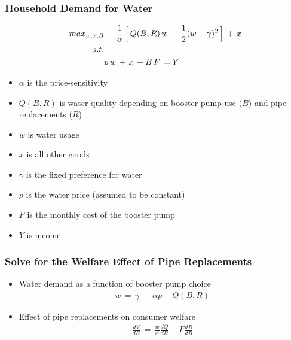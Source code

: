 \documentclass[aspectratio=32]{beamer}
\begin{document}
\begin{frame}
\frametitle{Household Demand for Water}

\begin{align*}
\label{eq:utility}
max_{w,x,B} &\hspace{.5cm}\frac{1}{\alpha} \, \Big[ \,  Q(B,R) \,  w  \, -\, \frac{1}{2}(w - \gamma)^2 \, \Big] \, + \, x  \\
s.t.& \\
&p\,w \,+\, x \, +  B \, F \, = Y
\end{align*}

\begin{itemize}
  \item $\alpha$ is the price-sensitivity
  \item $Q(B,R)$ is water quality depending on booster pump use ($B$) and pipe replacements ($R$)
  \item $w$ is water usage
  \item $x$ is all other goods
  \item $\gamma$ is the fixed preference for water
  \item $p$ is the water price (assumed to be constant)
  \item $F$ is the monthly cost of the booster pump
  \item $Y$ is income
\end{itemize}

\end{frame}


\begin{frame}
\frametitle{Solve for the Welfare Effect of Pipe Replacements }

\begin{itemize}
  \item Water demand as a function of booster pump choice
      \begin{align*}
      w \, = \, \gamma \, - \, \alpha p +  Q(B,R)
      \end{align*}
  \item Effect of pipe replacements on consumer welfare
      \begin{align*}
      \frac{dV}{dR}\,=\,\frac{w}{\alpha} \frac{dQ}{dR} - F \frac{dB}{dR}
      \end{align*}
\end{itemize}

\end{frame}
\end{document}

